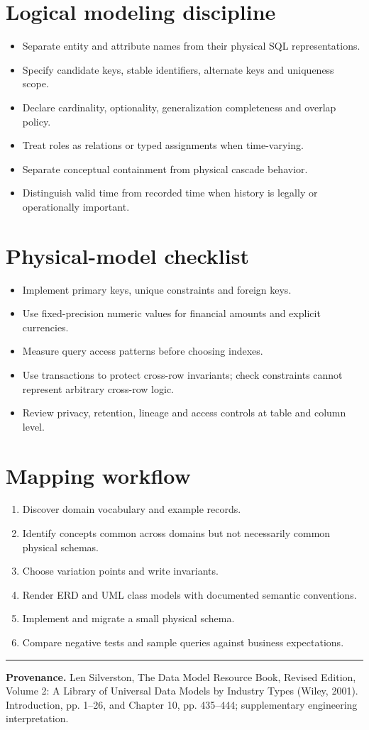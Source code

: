 \documentclass[11pt,letterpaper]{article}
\begin{document}
\section{Logical modeling discipline}
\begin{itemize}
\item Separate entity and attribute names from their physical SQL representations.
\item Specify candidate keys, stable identifiers, alternate keys and uniqueness scope.
\item Declare cardinality, optionality, generalization completeness and overlap policy.
\item Treat roles as relations or typed assignments when time-varying.
\item Separate conceptual containment from physical cascade behavior.
\item Distinguish valid time from recorded time when history is legally or operationally important.
\end{itemize}

\section{Physical-model checklist}
\begin{itemize}
\item Implement primary keys, unique constraints and foreign keys.
\item Use fixed-precision numeric values for financial amounts and explicit currencies.
\item Measure query access patterns before choosing indexes.
\item Use transactions to protect cross-row invariants; check constraints cannot represent arbitrary cross-row logic.
\item Review privacy, retention, lineage and access controls at table and column level.
\end{itemize}

\section{Mapping workflow}
\begin{enumerate}
\item Discover domain vocabulary and example records.
\item Identify concepts common across domains but not necessarily common physical schemas.
\item Choose variation points and write invariants.
\item Render ERD and UML class models with documented semantic conventions.
\item Implement and migrate a small physical schema.
\item Compare negative tests and sample queries against business expectations.
\end{enumerate}

\vfill
\hrule
{\footnotesize\textbf{Provenance.} Len Silverston, The Data Model Resource Book, Revised Edition, Volume 2: A Library of Universal Data Models by Industry Types (Wiley, 2001). Introduction, pp. 1--26, and Chapter 10, pp. 435--444; supplementary engineering interpretation.}
\end{document}
